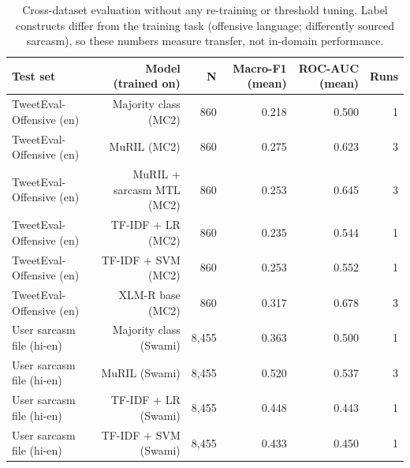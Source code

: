 \begin{table}[t]
\centering
\small
\caption{Cross-dataset evaluation without any re-training or threshold tuning. Label constructs differ from the training task (offensive language; differently sourced sarcasm), so these numbers measure transfer, not in-domain performance.}
\label{tab:tab10_external}
\begin{tabular}{lrrrrr}
\toprule
Test set & Model (trained on) & N & Macro-F1 (mean) & ROC-AUC (mean) & Runs \\
\midrule
TweetEval-Offensive (en) & Majority class (MC2) & 860 & 0.218 & 0.500 & 1 \\
TweetEval-Offensive (en) & MuRIL (MC2) & 860 & 0.275 & 0.623 & 3 \\
TweetEval-Offensive (en) & MuRIL + sarcasm MTL (MC2) & 860 & 0.253 & 0.645 & 3 \\
TweetEval-Offensive (en) & TF-IDF + LR (MC2) & 860 & 0.235 & 0.544 & 1 \\
TweetEval-Offensive (en) & TF-IDF + SVM (MC2) & 860 & 0.253 & 0.552 & 1 \\
TweetEval-Offensive (en) & XLM-R base (MC2) & 860 & 0.317 & 0.678 & 3 \\
User sarcasm file (hi-en) & Majority class (Swami) & 8,455 & 0.363 & 0.500 & 1 \\
User sarcasm file (hi-en) & MuRIL (Swami) & 8,455 & 0.520 & 0.537 & 3 \\
User sarcasm file (hi-en) & TF-IDF + LR (Swami) & 8,455 & 0.448 & 0.443 & 1 \\
User sarcasm file (hi-en) & TF-IDF + SVM (Swami) & 8,455 & 0.433 & 0.450 & 1 \\
\bottomrule
\end{tabular}
\end{table}
